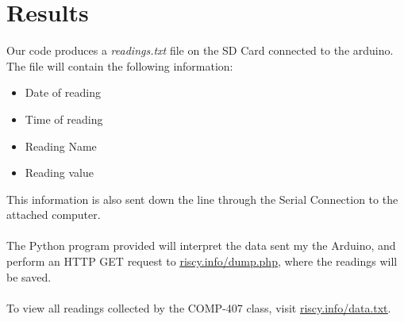 \documentclass{article}
\begin{document}
  \section*{Results}
  Our code produces a \textit{readings.txt} file on the SD Card connected to the arduino. The file will contain the following information:\\
  \begin{itemize}
    \item Date of reading
    \item Time of reading
    \item Reading Name
    \item Reading value
  \end{itemize}
  This information is also sent down the line through the Serial Connection to the attached computer.\\
  \\
  The Python program provided will interpret the data sent my the Arduino, and perform an HTTP GET request to \href{http://riscy.info/dump.php}{\underline{\textcolor{Emerald}{riscy.info/dump.php}}}, where the readings will be saved.\\\\
  To view all readings collected by the COMP-407 class, visit \href{http://riscy.info/data.txt}{{\underline{\textcolor{Emerald}{riscy.info/data.txt}}}}.
\end{document}
